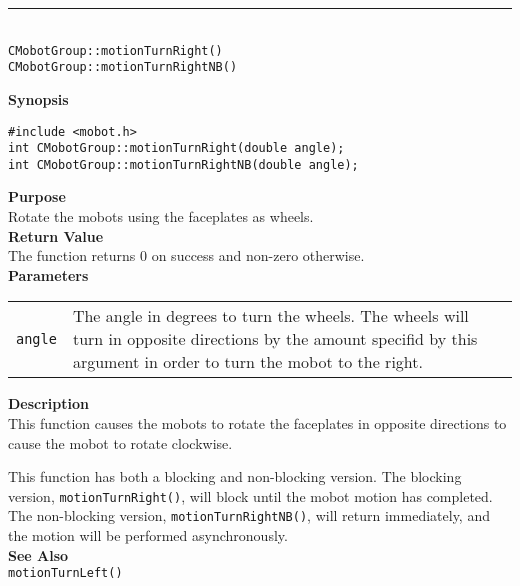 \noindent
\vspace{5pt}
\rule{4.5in}{0.015in}\\
\noindent
{\LARGE \texttt{CMobotGroup::motionTurnRight()}}\\
{\LARGE \texttt{CMobotGroup::motionTurnRightNB()}}\\
{}

\noindent
{\bf Synopsis}
\vspace{-8pt}
\begin{verbatim}
#include <mobot.h>
int CMobotGroup::motionTurnRight(double angle);
int CMobotGroup::motionTurnRightNB(double angle);
\end{verbatim}

\noindent
{\bf Purpose}\\
Rotate the mobots using the faceplates as wheels.\\

\noindent
{\bf Return Value}\\
The function returns 0 on success and non-zero otherwise.\\

\noindent
{\bf Parameters}\\
\vspace{-0.1in}
\begin{description}
\item               
\begin{tabular}{p{10 mm}p{145 mm}}
\texttt{angle} & The angle in degrees to turn the wheels. The wheels will turn in opposite directions by the amount specifid by this argument in order to turn the mobot to the right. \\
\end{tabular}
\end{description}

\noindent
{\bf Description}\\
This function causes the mobots to rotate the faceplates in opposite directions
to cause the mobot to rotate clockwise.

This function has both a blocking and non-blocking version.
The blocking version, \texttt{motionTurnRight()}, will block until the
mobot motion has completed. The non-blocking version, \texttt{motionTurnRightNB()},
will return immediately, and the motion will be performed asynchronously.\\

\noindent
{\bf See Also}\\
\texttt{motionTurnLeft()}

